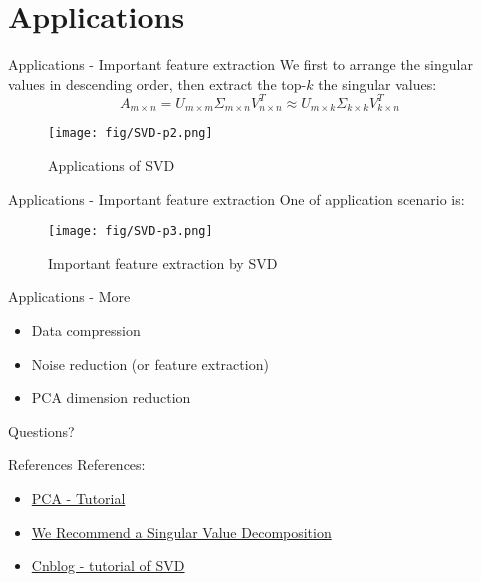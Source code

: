 \documentclass[10pt]{beamer}
\begin{document}
\section{Applications}

\begin{frame}{Applications - Important feature extraction}
  We first to arrange the singular values in descending order, then extract the top-$k$ the singular values:
  $$A_{m \times n} = U_{m \times m}\Sigma_{m \times n} V^T_{n \times n} \approx U_{m \times k}\Sigma_{k \times k} V^T_{k \times n}$$
  \begin{figure}[htbp]
    \centering
    \texttt{[image: fig/SVD-p2.png]}
    \caption{Applications of SVD}
  \end{figure}
\end{frame}

\begin{frame}{Applications - Important feature extraction}
  One of application scenario is:
  \begin{figure}[htbp]
    \centering
    \texttt{[image: fig/SVD-p3.png]}
    \caption{Important feature extraction by SVD}
  \end{figure}
\end{frame}

\begin{frame}{Applications - More}
  \begin{itemize}
    \item Data compression
    \item Noise reduction (or feature extraction)
    \item PCA dimension reduction
  \end{itemize}
\end{frame}

\begin{frame}[standout]
  Questions?
\end{frame}

\begin{frame}{References}
  References:
  \begin{itemize}
    \item \href{http://blog.codinglabs.org/articles/pca-tutorial.html}{PCA - Tutorial}
    \item \href{http://www.ams.org/publicoutreach/feature-column/fcarc-svd}{We Recommend a Singular Value Decomposition}
    \item \href{https://www.cnblogs.com/pinard/p/6251584.html}{Cnblog - tutorial of SVD}
  \end{itemize}
\end{frame}
\end{document}
